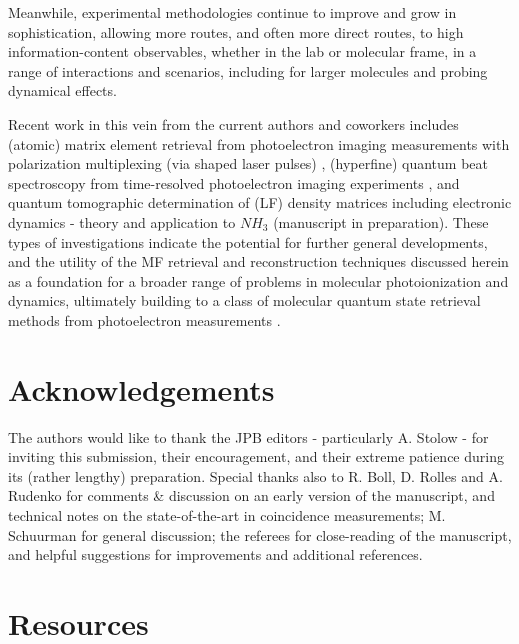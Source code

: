 \documentclass[10pt]{article}
\begin{document}
Meanwhile, experimental methodologies continue to improve and grow in sophistication, allowing more routes, and often more direct routes, to high information-content observables, whether in the lab or molecular frame, in a range of interactions and scenarios, including for larger molecules and probing dynamical effects. 


Recent work in this vein from the current authors and coworkers includes (atomic) matrix element retrieval from photoelectron imaging measurements with polarization multiplexing (via shaped laser pulses) \cite{hockett2014CompletePhotoionizationExperiments, hockett2015MaximuminformationPhotoelectronMetrology,hockett2015CoherentControlPhotoelectron, hockett2015CompletePhotoionizationExperiments}, (hyperfine) quantum beat spectroscopy from time-resolved photoelectron imaging experiments \cite{forbes2018QuantumbeatPhotoelectronimagingSpectroscopy}, and quantum tomographic determination of (LF) density matrices including electronic dynamics - theory \cite{gregory2022LaboratoryFrameDensity} and application to $NH_3$ (manuscript in preparation). These types of investigations indicate the potential for further general developments, and the utility of the MF retrieval and reconstruction techniques discussed herein as a foundation for a broader range of problems in molecular photoionization and dynamics, ultimately building to a class of molecular quantum state retrieval methods from photoelectron measurements \cite{hockett2018QMP1, hockett2018QMP2}. 





\section{Acknowledgements}

The authors would like to thank the JPB editors - particularly A. Stolow - for inviting this submission, their encouragement, and their extreme patience during its (rather lengthy) preparation. Special thanks also to R. Boll, D. Rolles and A. Rudenko for comments \& discussion on an early version of the manuscript, and technical notes on the state-of-the-art in coincidence measurements; M. Schuurman for general discussion; the referees for close-reading of the manuscript, and helpful suggestions for improvements and additional references.
\section{Resources\label{sec:resources}}
\end{document}
